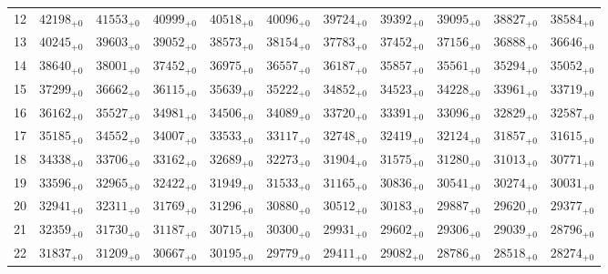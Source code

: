 \documentclass[10pt, a4paper]{article}
\begin{document}
\begin{center}
\begin{tabular}{c || c c c c c | c c c c c}
        12 & \({42198}_{+0}\) & \({41553}_{+0}\) & \({40999}_{+0}\) & \({40518}_{+0}\) & \({40096}_{+0}\) & \({39724}_{+0}\) & \({39392}_{+0}\) & \({39095}_{+0}\) & \({38827}_{+0}\) & \({38584}_{+0}\)\\
        13 & \({40245}_{+0}\) & \({39603}_{+0}\) & \({39052}_{+0}\) & \({38573}_{+0}\) & \({38154}_{+0}\) & \({37783}_{+0}\) & \({37452}_{+0}\) & \({37156}_{+0}\) & \({36888}_{+0}\) & \({36646}_{+0}\)\\
        14 & \({38640}_{+0}\) & \({38001}_{+0}\) & \({37452}_{+0}\) & \({36975}_{+0}\) & \({36557}_{+0}\) & \({36187}_{+0}\) & \({35857}_{+0}\) & \({35561}_{+0}\) & \({35294}_{+0}\) & \({35052}_{+0}\)\\
        15 & \({37299}_{+0}\) & \({36662}_{+0}\) & \({36115}_{+0}\) & \({35639}_{+0}\) & \({35222}_{+0}\) & \({34852}_{+0}\) & \({34523}_{+0}\) & \({34228}_{+0}\) & \({33961}_{+0}\) & \({33719}_{+0}\)\\
        \hline
        16 & \({36162}_{+0}\) & \({35527}_{+0}\) & \({34981}_{+0}\) & \({34506}_{+0}\) & \({34089}_{+0}\) & \({33720}_{+0}\) & \({33391}_{+0}\) & \({33096}_{+0}\) & \({32829}_{+0}\) & \({32587}_{+0}\)\\
        17 & \({35185}_{+0}\) & \({34552}_{+0}\) & \({34007}_{+0}\) & \({33533}_{+0}\) & \({33117}_{+0}\) & \({32748}_{+0}\) & \({32419}_{+0}\) & \({32124}_{+0}\) & \({31857}_{+0}\) & \({31615}_{+0}\)\\
        18 & \({34338}_{+0}\) & \({33706}_{+0}\) & \({33162}_{+0}\) & \({32689}_{+0}\) & \({32273}_{+0}\) & \({31904}_{+0}\) & \({31575}_{+0}\) & \({31280}_{+0}\) & \({31013}_{+0}\) & \({30771}_{+0}\)\\
        19 & \({33596}_{+0}\) & \({32965}_{+0}\) & \({32422}_{+0}\) & \({31949}_{+0}\) & \({31533}_{+0}\) & \({31165}_{+0}\) & \({30836}_{+0}\) & \({30541}_{+0}\) & \({30274}_{+0}\) & \({30031}_{+0}\)\\
        20 & \({32941}_{+0}\) & \({32311}_{+0}\) & \({31769}_{+0}\) & \({31296}_{+0}\) & \({30880}_{+0}\) & \({30512}_{+0}\) & \({30183}_{+0}\) & \({29887}_{+0}\) & \({29620}_{+0}\) & \({29377}_{+0}\)\\
        \hline
        21 & \({32359}_{+0}\) & \({31730}_{+0}\) & \({31187}_{+0}\) & \({30715}_{+0}\) & \({30300}_{+0}\) & \({29931}_{+0}\) & \({29602}_{+0}\) & \({29306}_{+0}\) & \({29039}_{+0}\) & \({28796}_{+0}\)\\
        22 & \({31837}_{+0}\) & \({31209}_{+0}\) & \({30667}_{+0}\) & \({30195}_{+0}\) & \({29779}_{+0}\) & \({29411}_{+0}\) & \({29082}_{+0}\) & \({28786}_{+0}\) & \({28518}_{+0}\) & \({28274}_{+0}\)\\

\end{tabular}
\end{center}
\end{document}

